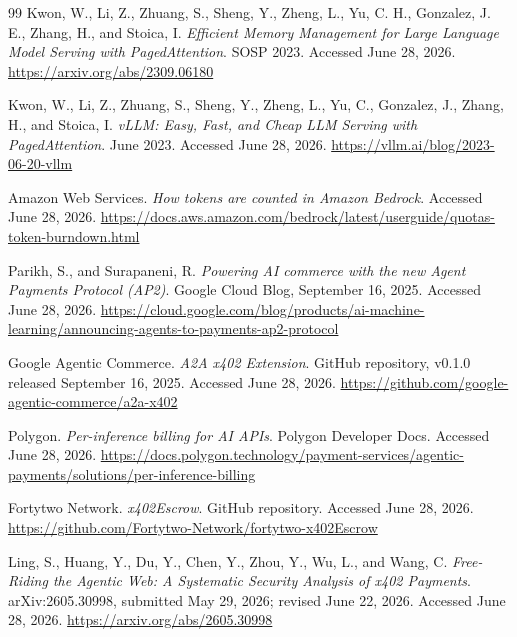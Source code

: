 \documentclass[11pt]{article}
\begin{document}
\begin{thebibliography}{99}
Kwon, W., Li, Z., Zhuang, S., Sheng, Y., Zheng, L., Yu, C. H., Gonzalez, J. E., Zhang, H., and Stoica, I.
\textit{Efficient Memory Management for Large Language Model Serving with PagedAttention}.
SOSP 2023. Accessed June 28, 2026.
\url{https://arxiv.org/abs/2309.06180}

Kwon, W., Li, Z., Zhuang, S., Sheng, Y., Zheng, L., Yu, C., Gonzalez, J., Zhang, H., and Stoica, I.
\textit{vLLM: Easy, Fast, and Cheap LLM Serving with PagedAttention}.
June 2023. Accessed June 28, 2026.
\url{https://vllm.ai/blog/2023-06-20-vllm}

Amazon Web Services.
\textit{How tokens are counted in Amazon Bedrock}.
Accessed June 28, 2026.
\url{https://docs.aws.amazon.com/bedrock/latest/userguide/quotas-token-burndown.html}

Parikh, S., and Surapaneni, R.
\textit{Powering AI commerce with the new Agent Payments Protocol (AP2)}.
Google Cloud Blog, September 16, 2025. Accessed June 28, 2026.
\url{https://cloud.google.com/blog/products/ai-machine-learning/announcing-agents-to-payments-ap2-protocol}

Google Agentic Commerce.
\textit{A2A x402 Extension}.
GitHub repository, v0.1.0 released September 16, 2025. Accessed June 28, 2026.
\url{https://github.com/google-agentic-commerce/a2a-x402}

Polygon.
\textit{Per-inference billing for AI APIs}.
Polygon Developer Docs. Accessed June 28, 2026.
\url{https://docs.polygon.technology/payment-services/agentic-payments/solutions/per-inference-billing}

Fortytwo Network.
\textit{x402Escrow}.
GitHub repository. Accessed June 28, 2026.
\url{https://github.com/Fortytwo-Network/fortytwo-x402Escrow}

Ling, S., Huang, Y., Du, Y., Chen, Y., Zhou, Y., Wu, L., and Wang, C.
\textit{Free-Riding the Agentic Web: A Systematic Security Analysis of x402 Payments}.
arXiv:2605.30998, submitted May 29, 2026; revised June 22, 2026. Accessed June 28, 2026.
\url{https://arxiv.org/abs/2605.30998}

\end{thebibliography}
\end{document}
